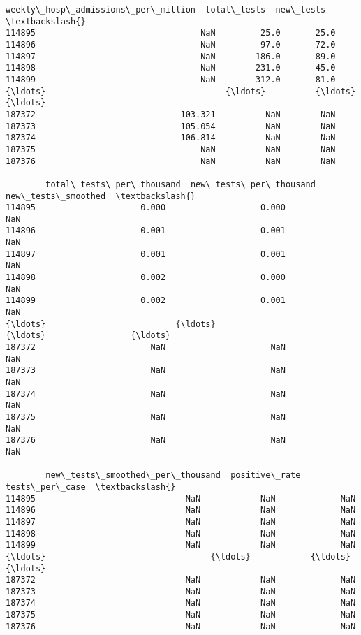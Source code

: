 \documentclass[11pt]{article}
\begin{document}
\begin{tcolorbox}[breakable, size=fbox, boxrule=.5pt, pad at break*=1mm, opacityfill=0]
\begin{Verbatim}[commandchars=\\\{\}]
        weekly\_hosp\_admissions\_per\_million  total\_tests  new\_tests  \textbackslash{}
114895                                 NaN         25.0       25.0
114896                                 NaN         97.0       72.0
114897                                 NaN        186.0       89.0
114898                                 NaN        231.0       45.0
114899                                 NaN        312.0       81.0
{\ldots}                                    {\ldots}          {\ldots}        {\ldots}
187372                             103.321          NaN        NaN
187373                             105.054          NaN        NaN
187374                             106.814          NaN        NaN
187375                                 NaN          NaN        NaN
187376                                 NaN          NaN        NaN

        total\_tests\_per\_thousand  new\_tests\_per\_thousand  new\_tests\_smoothed  \textbackslash{}
114895                     0.000                   0.000                 NaN
114896                     0.001                   0.001                 NaN
114897                     0.001                   0.001                 NaN
114898                     0.002                   0.000                 NaN
114899                     0.002                   0.001                 NaN
{\ldots}                          {\ldots}                     {\ldots}                 {\ldots}
187372                       NaN                     NaN                 NaN
187373                       NaN                     NaN                 NaN
187374                       NaN                     NaN                 NaN
187375                       NaN                     NaN                 NaN
187376                       NaN                     NaN                 NaN

        new\_tests\_smoothed\_per\_thousand  positive\_rate  tests\_per\_case  \textbackslash{}
114895                              NaN            NaN             NaN
114896                              NaN            NaN             NaN
114897                              NaN            NaN             NaN
114898                              NaN            NaN             NaN
114899                              NaN            NaN             NaN
{\ldots}                                 {\ldots}            {\ldots}             {\ldots}
187372                              NaN            NaN             NaN
187373                              NaN            NaN             NaN
187374                              NaN            NaN             NaN
187375                              NaN            NaN             NaN
187376                              NaN            NaN             NaN


\end{Verbatim}
\end{tcolorbox}
\end{document}
